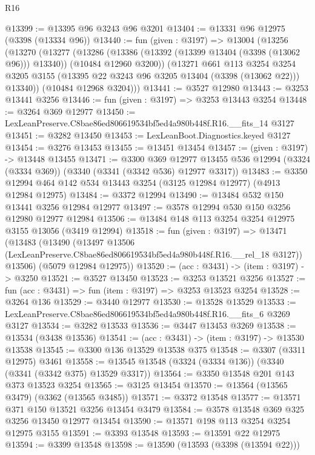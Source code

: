 \begin{lexlean}{R16}
\begin{coremodule}
@13399 := @13395 @96 @3243 @96 @3201
@13404 := @13331 @96 @12975 (@3398 (@13334 @96))
@13440 := fun (given : @3197) =>
  @13004
    (@13256
      (@13270
        (@13277
          (@13286
            (@13386 (@13392 (@13399 @13404 (@3398 (@13062 @96))) @13340))
            (@10484 @12960 @3200))
          (@13271
            @661
            @113
            @3254
            @3254
            @3205
            @3155
            (@13395 @22 @3243 @96 @3205 @13404 (@3398 (@13062 @22)))
            @13340))
        (@10484 @12968 @3204)))
@13441 := @3527 @12980
@13443 := @3253 @13441 @3256
@13446 := fun (given : @3197) => @3253 @13443 @3254
@13448 := @3264 @369 @12977
@13450 := LexLeanPreserve.C8bae86ed806619534bf5ed4a980b448f.R16.__fits_14 @3127
@13451 := @3282 @13450
@13453 := LexLeanBoot.Diagnostics.keyed @3127
@13454 := @3276 @13453
@13455 := @13451 @13454
@13457 := (given : @3197) -> @13448 @13455
@13471 := @3300
    @369
    @12977
    @13455
    @536
    @12994
    (@3324 (@3334 @369))
    (@3340 (@3341 (@3342 @536) @12977 @3317))
@13483 := @3350 @12994 @464 @142 @534 @13443 @3254 (@3125 @12984 @12977) (@4913 @12984 @12975)
@13484 := @3372 @12994
@13490 := @13484 @532 @150 @13441 @3256 @12984 @12977
@13497 := @3578 @12994 @530 @150 @3256 @12980 @12977 @12984
@13506 := @13484 @148 @113 @3254 @3254 @12975 @3155 @13056 (@3419 @12994)
@13518 := fun (given : @3197) =>
  @13471
    (@13483
      (@13490
        (@13497 @13506 (LexLeanPreserve.C8bae86ed806619534bf5ed4a980b448f.R16.__rel_18 @3127))
        @13506)
      (@5079 @12984 @12975))
@13520 := (acc : @3431) -> (item : @3197) -> @3250
@13521 := @3527 @13450
@13523 := @3253 @13521 @3256
@13527 := fun (acc : @3431) => fun (item : @3197) => @3253 @13523 @3254
@13528 := @3264 @136
@13529 := @3440 @12977
@13530 := @13528 @13529
@13533 := LexLeanPreserve.C8bae86ed806619534bf5ed4a980b448f.R16.__fits_6 @3269 @3127
@13534 := @3282 @13533
@13536 := @3447 @13453 @3269
@13538 := @13534 (@3438 @13536)
@13541 := (acc : @3431) -> (item : @3197) -> @13530 @13538
@13545 := @3300 @136 @13529 @13538 @375
@13548 := @3307 (@3311 @12975) @3461
@13558 := @13545 @13548 (@3324 (@3334 @136)) (@3340 (@3341 (@3342 @375) @13529 @3317))
@13564 := @3350 @13548 @201 @143 @373 @13523 @3254
@13565 := @3125 @13454
@13570 := @13564 (@13565 @3479) (@3362 (@13565 @3485))
@13571 := @3372 @13548
@13577 := @13571 @371 @150 @13521 @3256 @13454 @3479
@13584 := @3578 @13548 @369 @325 @3256 @13450 @12977 @13454
@13590 := @13571 @198 @113 @3254 @3254 @12975 @3155
@13591 := @3393 @13548
@13593 := @13591 @22 @12975
@13594 := @3399 @13548
@13598 := @13590 (@13593 (@3398 (@13594 @22)))

\end{coremodule}
\end{lexlean}
